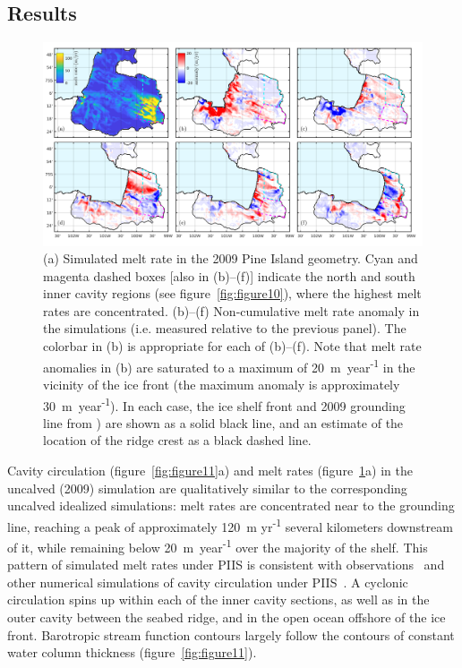 \documentclass[draft]{agujournal2019}
\begin{document}
\subsection{Results}

\begin{figure}
    \centering
    \includegraphics[width = \textwidth]{../make_figures/plots/figure12.png}
    \caption{(a) Simulated melt rate in the 2009 Pine Island geometry. Cyan and magenta dashed boxes [also in (b)--(f)] indicate the north and south inner cavity regions (see figure~\ref{fig:figure10}), where the highest melt rates are concentrated. (b)--(f) Non-cumulative melt rate anomaly in the simulations (i.e. measured relative to the previous panel). The colorbar in (b) is appropriate for each of (b)--(f). Note that melt rate anomalies in (b) are saturated to a maximum of 20~m~year\textsuperscript{-1} in the vicinity of the ice front (the maximum anomaly is approximately 30~m~year\textsuperscript{-1}). In each case, the ice shelf front and 2009 grounding line from ) are shown as a solid black line, and an estimate of the location of the ridge crest as a black dashed line.}
    \label{fig:figure12}
\end{figure}


Cavity circulation (figure~\ref{fig:figure11}a) and melt rates (figure~\ref{fig:figure12}a) in the uncalved (2009) simulation are qualitatively similar to the corresponding uncalved idealized simulations: melt rates are concentrated near to the grounding line, reaching a peak of approximately 120~m yr\textsuperscript{-1} several kilometers downstream of it, while remaining below 20~m~year\textsuperscript{-1} over the majority of the shelf. This pattern of simulated melt rates under PIIS is consistent with observations~\cite{Dutrieux2013Cryosphere} and other numerical simulations of cavity circulation under PIIS~\cite[for example]{Heimbach2012AnnGlac}. A cyclonic circulation spins up within each of the inner cavity sections, as well as in the outer cavity between the seabed ridge, and in the open ocean offshore of the ice front. Barotropic stream function contours largely follow the contours of constant water column thickness (figure~\ref{fig:figure11}).
\end{document}
